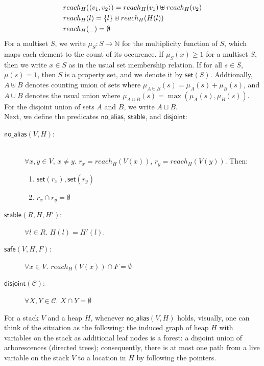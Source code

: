 \documentclass[sigconf]{acmart}
\newcommand{\ms}[1]{\ensuremath{\mathsf{#1}}}
\newcommand{\na}[1]{\mathsf{no\_alias}(#1)}
\newcommand{\dist}[1]{\mathsf{disjoint}(#1)}
\theoremstyle{definition}
\begin{document}
\begin{align*}
&reach_H(\langle v_1, v_2\rangle) = reach_H(v_1) \uplus reach_H(v_2)\\
&reach_H(l) = \{l\} \uplus reach_H(H(l))\\
&reach_H(\_) = \emptyset
\end{align*}
For a multiset $S$, we write $\mu_S : S \to \mathbb{N}$ for the multiplicity function of $S$, which maps each element to the count of its occurence. If $\mu_S(x) \ge 1$ for a multiset $S$, then we write $x \in S$ as in the usual set membership relation. If for all  $s \in S$, $\mu(s) = 1$, then $S$ is a property set, and we denote it by $\ms{set}(S)$. Addtionally, $A \uplus B$ denotes counting union of sets where $\mu_{A \uplus B} (s) = \mu_A (s) + \mu_B (s)$, and $A \cup B$ denotes the usual union where $\mu_{A \cup B}(s) = \max{(\mu_A(s),\mu_B(s))}$. For the disjoint union of sets $A$ and $B$, we write $A \sqcup B$.\\

\noindent
Next, we define the predicates $\ms{no\_alias}$, $\ms{stable}$, and $\ms{disjoint}$:
\begin{description}
\item[$\na{V,H}$: ] \\
$\forall x,y \in V$, $x \ne y$.  $r_x = reach_H(V(x))$, $r_y = reach_H(V(y))$. Then:
\begin{enumerate}
\item $\ms{set}(r_x), \ms{set}(r_y)$
\item $r_x \cap r_y = \emptyset$
\end{enumerate}
\item[$\ms{stable}(R,H,H')$: ] $\forall l \in R$. $H(l) = H'(l)$.
\item [$\ms{safe}(V,H,F)$: ] $\forall x \in V$. $reach_{H}(V(x)) \cap F = \emptyset$
\item[$\dist{\mathcal{C}}$: ] $\forall X,Y \in \mathcal{C}$. $X \cap Y = \emptyset$ 
\end{description}

For a stack $V$ and a heap $H$, whenever $\na{V,H}$ holds, visually, one can think of the situation as the following: the induced graph of heap $H$ with variables on the stack as additional leaf nodes is a forest: a disjoint union of arborescences (directed trees); consequently, there is at most one path from a live variable on the stack $V$ to a location in $H$ by following the pointers.\\
\end{document}
